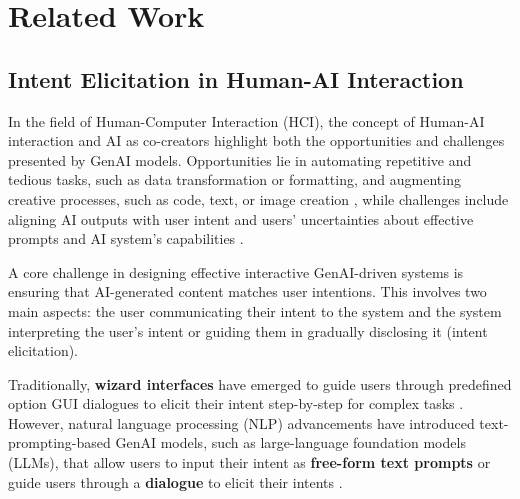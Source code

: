 
\section{Related Work}
\subsection{Intent Elicitation in Human-AI Interaction}

In the field of Human-Computer Interaction (HCI), the concept of Human-AI interaction \cite{amershi_guidelines_2019} and AI as co-creators \cite{davis_enactive_2015, oh_lead_2018} highlight both the opportunities and challenges presented by GenAI models. 
Opportunities lie in automating repetitive and tedious tasks, such as data transformation or formatting, and augmenting creative processes, such as code, text, or image creation \cite{chen_evaluating_2021,brown_language_2020,ramesh_hierarchical_2022, saharia_photorealistic_2022}, while challenges include aligning AI outputs with user intent and users' uncertainties about effective prompts and AI system’s capabilities \cite{chen_evaluating_2021,zamfirescu-pereira_why_2023}.

A core challenge in designing effective interactive GenAI-driven systems is ensuring that AI-generated content matches user intentions. 
This involves two main aspects: the user communicating their intent to the system and the system interpreting the user's intent or guiding them in gradually disclosing it (intent elicitation). 
    
Traditionally, \textbf{wizard interfaces} have emerged to guide users through predefined option GUI dialogues to elicit their intent step-by-step for complex tasks \cite{cooper_face_2014}. 
However, natural language processing (NLP) advancements have introduced text-prompting-based GenAI models, such as large-language foundation models (LLMs), that allow users to input their intent as \textbf{free-form text prompts} \cite{liu_pretrain_2021} or guide users through a \textbf{dialogue} to elicit their intents \cite{park_user_2023,sahijwani_adaptive_2022, cai_predicting_2020, qu_user_2019}. 
    
